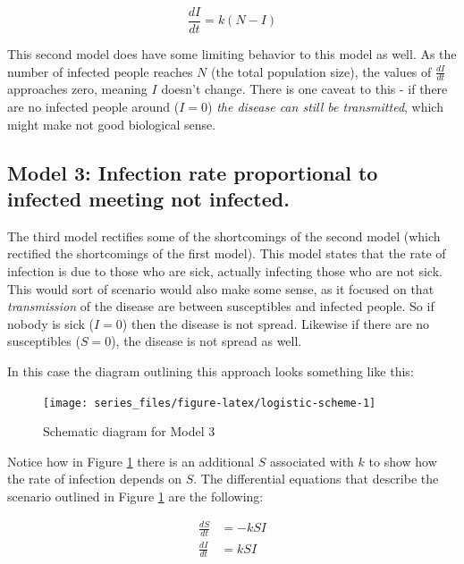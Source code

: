 \documentclass[
]{book}
\theoremstyle{definition}
\theoremstyle{definition}
\theoremstyle{definition}
\theoremstyle{remark}
\begin{document}
\begin{equation}
\frac{dI}{dt} = k(N-I) \label{eq:02single}
\end{equation}

This second model does have some limiting behavior to this model as well. As the number of infected people reaches \(N\) (the total population size), the values of \(\displaystyle \frac{dI}{dt}\) approaches zero, meaning \(I\) doesn't change. There is one caveat to this - if there are no infected people around (\(I=0\)) \emph{the disease can still be transmitted}, which might make not good biological sense.

\hypertarget{model-3-infection-rate-proportional-to-infected-meeting-not-infected.}{%
\subsection{Model 3: Infection rate proportional to infected meeting not infected.}\label{model-3-infection-rate-proportional-to-infected-meeting-not-infected.}}

The third model rectifies some of the shortcomings of the second model (which rectified the shortcomings of the first model). This model states that the rate of infection is due to those who are sick, actually infecting those who are not sick. This would sort of scenario would also make some sense, as it focused on that \emph{transmission} of the disease are between susceptibles and infected people. So if nobody is sick (\(I=0\)) then the disease is not spread. Likewise if there are no susceptibles (\(S=0\)), the disease is not spread as well.

In this case the diagram outlining this approach looks something like this:

\begin{figure}

{\centering \texttt{[image: series\_files/figure-latex/logistic-scheme-1]} 

}

\caption{Schematic diagram for Model 3}\label{fig:logistic-scheme}
\end{figure}

Notice how in Figure \ref{fig:logistic-scheme} there is an additional \(S\) associated with \(k\) to show how the rate of infection depends on \(S\). The differential equations that describe the scenario outlined in Figure \ref{fig:logistic-scheme} are the following:

\begin{align*}
\frac{dS}{dt} &= -kSI \\
\frac{dI}{dt} &= kSI
\end{align*}
\end{document}
